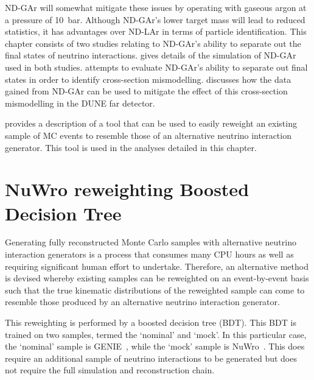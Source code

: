 ND-GAr will somewhat mitigate these issues by operating with gaseous argon at a pressure of 10~bar.
Although ND-GAr's lower target mass will lead to reduced statistics, it has advantages over ND-LAr in terms of particle identification.
This chapter consists of two studies relating to ND-GAr's ability to separate out the final states of neutrino interactions.
 gives details of the simulation of ND-GAr used in both studies.
 attempts to evaluate ND-GAr's ability to separate out final states in order to identify cross-section mismodelling.
 discusses how the data gained from ND-GAr can be used to mitigate the effect of this cross-section mismodelling in the DUNE far detector.

 provides a description of a  tool that can be used to easily reweight an existing sample of MC events to resemble those of an alternative neutrino interaction generator.
This tool is used in the analyses detailed in this chapter.

\section{NuWro reweighting Boosted Decision Tree}
\label{sec:dune_ndrwt:bdt}

Generating fully reconstructed Monte Carlo samples with alternative neutrino interaction generators is a process that consumes many CPU hours as well as requiring significant human effort to undertake.
Therefore, an alternative method is devised whereby existing samples can be reweighted on an event-by-event basis such that the true kinematic distributions of the reweighted sample can come to resemble those produced by an alternative neutrino interaction generator.

This reweighting is performed by a boosted decision tree (BDT).
This BDT is trained on two samples, termed the `nominal' and `mock'.
In this particular case, the `nominal' sample is GENIE~\cite{genie}, while the `mock' sample is NuWro~\cite{nuwro}.
This does require an additional sample of neutrino interactions to be generated but does not require the full simulation and reconstruction chain.

